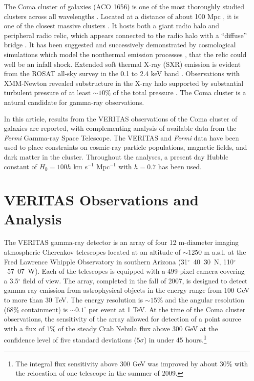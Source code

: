 \documentclass[12pt,manuscript]{aastex}
\def\Fermi{{\em Fermi}\xspace}
\begin{document}
The Coma cluster of galaxies (ACO 1656) is one of the most thoroughly studied clusters across all
wavelengths \citep{article:Voges_etal:1999}. Located at a distance of about 100 Mpc
\citep[$z=0.023$;][]{article:StrubleRood:1999}, it is one of the closest massive clusters \citep[$M
\sim10^{15}M_{\odot}$;][]{article:Smith:1983, article:Kubo_etal:2008}. It hosts both a giant radio
halo \citep{article:Giovannini_etal:1993,article:Thierbach_etal:2003} and peripheral radio relic,
which appears connected to the radio halo with a ``diffuse'' bridge \citep[see discussion
in][]{article:BrownRudnick:2010}. It has been suggested \citep{article:Ensslin_etal:1998} and
successively demonstrated by cosmological simulations which model the nonthermal emission
processes \citep{article:PfrommerEnsslinSpringel:2008, article:Pfrommer:2008,
article:Battaglia_etal:2009, article:Skillman_etal:2011}, that the relic could well be an infall
shock. Extended soft thermal X-ray (SXR) emission is evident from the ROSAT all-sky survey in the
0.1 to 2.4 keV band \citep{article:BrielHenryBohringer:1992}. Observations with XMM-Newton
\citep{article:Briel_etal:2001} revealed substructure in the X-ray halo supported by substantial
turbulent pressure of at least $\sim 10 \%$ of the total pressure
\citep{article:Schuecker_etal:2004}. The Coma cluster is a natural candidate for gamma-ray
observations.

In this article, results from the VERITAS observations of the Coma cluster of galaxies are
reported, with complementing analysis of available data from the \Fermi Gamma-ray Space Telescope.
The VERITAS and \Fermi data have been used to place constraints on cosmic-ray particle populations,
magnetic fields, and dark matter in the cluster. Throughout the analyses, a present day Hubble
constant of $H_{0} = 100h$ km s$^{-1}$ Mpc$^{-1}$ with $h=0.7$ has been used.

%
%

\section{VERITAS Observations and Analysis}
The VERITAS gamma-ray detector \citep{article:Weekes_etal:2002} is an array of four 12 m-diameter
imaging atmospheric Cherenkov telescopes \citep{article:Holder_etal:2006} located at an
altitude of $\sim$1250 m a.s.l. at the Fred Lawrence Whipple Observatory in southern Arizona
(31$^{\circ}$~40\arcmin~30\arcsec~N, 110$^{\circ}$~57\arcmin~07\arcsec~W). Each of the telescopes
is equipped with a 499-pixel camera covering a 3.5$^{\circ}$ field of view. The array, completed in
the fall of 2007, is designed to detect gamma-ray emission from astrophysical objects in the
energy range from 100 GeV to more than 30 TeV. The energy resolution is $\sim 15$\% and the angular
resolution (68\% containment) is $\sim 0.1^{\circ}$ per event at 1 TeV. At the time of the Coma
cluster observations, the sensitivity of the array allowed for detection of a point source with a
flux of 1\% of the steady Crab Nebula flux above 300 GeV at the confidence level of five standard
deviations ($5\sigma$) in under 45 hours.\footnote{The integral flux sensitivity above 300 GeV was
improved by about 30\% with the relocation of one telescope in the summer of 2009.}
\end{document}
